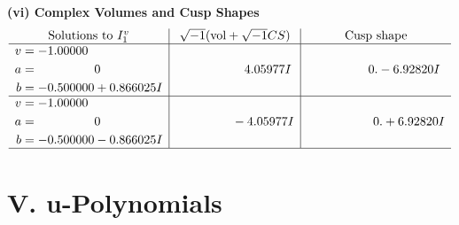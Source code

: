 \documentclass[1p]{elsarticle_modified}
\theoremstyle{definition}
\newcommand{\I}{\sqrt{-1}}
\begin{document}
\newpage\flushleft \textbf{(vi) Complex Volumes and Cusp Shapes}
$$\begin{array}{c|c|c}  
\text{Solutions to }I^v_{1}& \I (\text{vol} + \sqrt{-1}CS) & \text{Cusp shape}\\
 \hline 
\begin{aligned}
v &= -1.00000\phantom{ +0.000000I} \\
a &= \phantom{-0.000000 } 0 \\
b &= -0.500000 + 0.866025 I\end{aligned}
 & \phantom{-0.000000 -}4.05977 I & \phantom{-0.000000 } 0. - 6.92820 I \\ \hline\begin{aligned}
v &= -1.00000\phantom{ +0.000000I} \\
a &= \phantom{-0.000000 } 0 \\
b &= -0.500000 - 0.866025 I\end{aligned}
 & \phantom{-0.000000 } -4.05977 I & \phantom{-0.000000 -}0. + 6.92820 I\\
 \hline 
 \end{array}$$\newpage
\newpage\renewcommand{\arraystretch}{1}
\centering \section*{ V. u-Polynomials}
\end{document}
